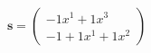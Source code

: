 \documentclass[preview]{standalone}
\begin{document}
\begin{align*}
\mathbf{s} = \begin{pmatrix}-1x^{1} + 1x^{3} \\ -1 + 1x^{1} + 1x^{2}\end{pmatrix}
\end{align*}
\end{document}
